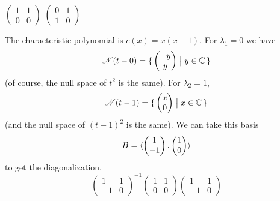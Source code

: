 \begin{exercises}
    \begin{exparts*}
       \partsitem \( \begin{pmatrix}
                  1  &1  \\
                  0  &0
                \end{pmatrix}  \)
       \partsitem \( \begin{pmatrix}
                  0  &1  \\
                  1  &0
                \end{pmatrix}  \)
    \end{exparts*}
    \begin{answer}
      \begin{exparts}
        \partsitem The characteristic polynomial is \( c(x)=x(x-1) \).
          For $\lambda_1=0$ we have
          \begin{equation*}
            \mathscr{N}(t-0)=\mbox{$\{\,\begin{pmatrix} -y \\ y \end{pmatrix}
                                 \bigm| y\in\mathbb{C} \,\}$}  
          \end{equation*} 
          (of course, the null space of $t^2$ is the same).
          For $\lambda_2=1$,
          \begin{equation*}
            \mathscr{N}(t-1)=\mbox{$\{\,\begin{pmatrix} x \\ 0 \end{pmatrix}
                                     \bigm| x\in\mathbb{C} \,\}$}  
          \end{equation*}
          (and the null space of $(t-1)^2$ is the same).
          We can take this basis
          \begin{equation*}
            B=\langle\begin{pmatrix} 1 \\ -1 \end{pmatrix},\begin{pmatrix} 1 \\ 0 \end{pmatrix}\rangle
          \end{equation*}
          to get the diagonalization.
          \begin{equation*}
            \begin{pmatrix}
              1  &1  \\
             -1  &0
            \end{pmatrix}^{-1}
            \begin{pmatrix}
              1  &1  \\
              0  &0
            \end{pmatrix}
            \begin{pmatrix}
              1  &1  \\
             -1  &0
            \end{pmatrix}

\end{equation*}
\end{exparts}
\end{answer}
\end{exercises}
